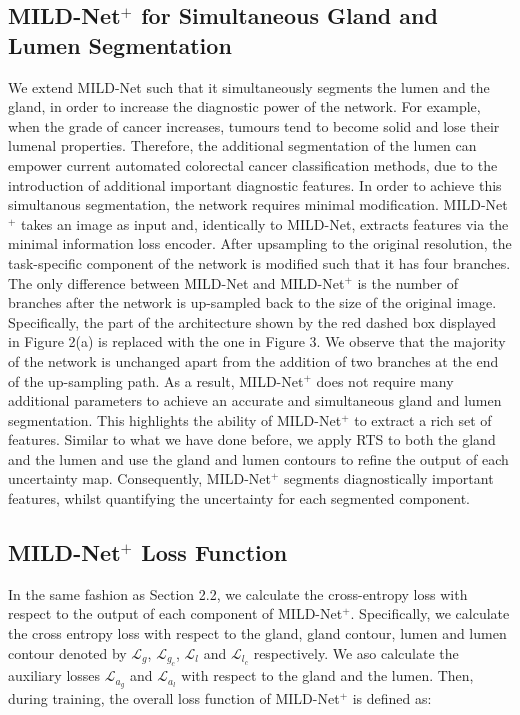 \documentclass[3p]{elsarticle}
\begin{document}
\subsection{MILD-Net$^+$ for Simultaneous Gland and Lumen Segmentation}

We extend MILD-Net such that it simultaneously segments the lumen and the gland, in order to increase the diagnostic power of the network. For example, when the grade of cancer increases, tumours tend to become solid and lose their lumenal properties. Therefore, the additional segmentation of the lumen can empower current automated colorectal cancer classification methods, due to the introduction of additional important diagnostic features. In order to achieve this simultanous segmentation, the network requires minimal modification. MILD-Net$^+$ takes an image as input and, identically to MILD-Net, extracts features via the minimal information loss encoder. After upsampling to the original resolution, the task-specific component of the network is modified such that it has four branches. The only difference between MILD-Net and MILD-Net$^+$ is the number of branches after the network is up-sampled back to the size of the original image. Specifically, the part of the architecture shown by the red dashed box displayed in Figure 2(a) is replaced with the one in Figure 3. We observe that the majority of the network is unchanged apart from the addition of two branches at the end of the up-sampling path. As a result, MILD-Net$^+$ does not require many additional parameters to achieve an accurate and simultaneous gland and lumen segmentation. This highlights the ability of MILD-Net$^+$ to extract a rich set of features. Similar to what we have done before, we apply RTS to both the gland and the lumen and use the gland and lumen contours to refine the output of each uncertainty map. Consequently, MILD-Net$^+$ segments diagnostically important features, whilst quantifying the uncertainty for each segmented component.

\subsection{MILD-Net$^+$ Loss Function}

In the same fashion as Section 2.2, we calculate the cross-entropy loss with respect to the output of each component of MILD-Net$^+$. Specifically, we calculate the cross entropy loss with respect to the gland, gland contour, lumen and lumen contour denoted by $\mathcal{L}_g$, $\mathcal{L}_{g_c}$, $\mathcal{L}_l$ and $\mathcal{L}_{l_c}$ respectively. We aso calculate the auxiliary losses $\mathcal{L}_{a_g}$ and $\mathcal{L}_{a_l}$ with respect to the gland and the lumen. Then, during training, the overall loss function of MILD-Net$^+$ is defined as:
\end{document}
